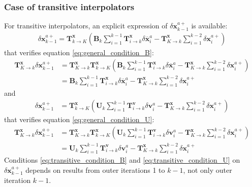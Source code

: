 \documentclass[12pt]{scrartcl}
\begin{document}
\subsubsection{Case of transitive interpolators}
For transitive interpolators, an explicit expression of $\delta \mathbf{x}^{a+}_{k-1}$ is available:
\begin{align}
\label{eq:transitive_condition_B}
\delta \mathbf{x}^{a+}_{k-1} = \mathbf{T}^\mathbf{x}_{k \rightarrow K} \left(\mathbf{B}_k \sum_{i=1}^{k-1} \mathbf{T}^\mathbf{x}_{i \rightarrow k} \delta \overline{\mathbf{x}}^a_i - \mathbf{T}^\mathbf{x}_{K \rightarrow k} \sum_{i=1}^{k-2} \delta \mathbf{x}^{a+}_i\right)
\end{align}
that verifies equation \eqref{eq:general_condition_B}:
\begin{align}
\mathbf{T}^\mathbf{x}_{K \rightarrow k} \delta \mathbf{x}^{a+}_{k-1} & = \mathbf{T}^\mathbf{x}_{K \rightarrow k} \mathbf{T}^\mathbf{x}_{k \rightarrow K} \left(\mathbf{B}_k \sum_{i=1}^{k-1} \mathbf{T}^\mathbf{x}_{i \rightarrow k} \delta \overline{\mathbf{x}}^a_i - \mathbf{T}^\mathbf{x}_{K \rightarrow k} \sum_{i=1}^{k-2} \delta \mathbf{x}^{a+}_i\right) \nonumber \\
& = \mathbf{B}_k \sum_{i=1}^{k-1} \mathbf{T}^\mathbf{x}_{i \rightarrow k} \delta \overline{\mathbf{x}}^a_i - \mathbf{T}^\mathbf{x}_{K \rightarrow k} \sum_{i=1}^{k-2} \delta \mathbf{x}^{a+}_i
\end{align}
and
\begin{align}
\label{eq:transitive_condition_U}
\delta \mathbf{x}^{a+}_{k-1} & = \mathbf{T}^\mathbf{x}_{k \rightarrow K} \left(\mathbf{U}_k \sum_{i=1}^{k-1} \mathbf{T}^\mathbf{v}_{i \rightarrow k} \delta \mathbf{v}^a_i - \mathbf{T}^\mathbf{x}_{K \rightarrow k} \sum_{i=1}^{k-2} \delta \mathbf{x}^{a+}_i\right)
\end{align}
that verifies equation \eqref{eq:general_condition_U}:
\begin{align}
\mathbf{T}^\mathbf{x}_{K \rightarrow k} \delta \mathbf{x}^{a+}_{k-1} & = \mathbf{T}^\mathbf{x}_{K \rightarrow k} \mathbf{T}^\mathbf{x}_{k \rightarrow K} \left(\mathbf{U}_k \sum_{i=1}^{k-1} \mathbf{T}^\mathbf{v}_{i \rightarrow k} \delta \mathbf{v}^a_i - \mathbf{T}^\mathbf{x}_{K \rightarrow k} \sum_{i=1}^{k-2} \delta \mathbf{x}^{a+}_i\right) \nonumber \\
& = \mathbf{U}_k \sum_{i=1}^{k-1} \mathbf{T}^\mathbf{v}_{i \rightarrow k} \delta \mathbf{v}^a_i - \mathbf{T}^\mathbf{x}_{K \rightarrow k} \sum_{i=1}^{k-2} \delta \mathbf{x}^{a+}_i
\end{align}
Conditions \eqref{eq:transitive_condition_B} and \eqref{eq:transitive_condition_U} on $\delta \mathbf{x}^{a+}_{k-1}$ depends on results from outer iterations 1 to $k-1$, not only outer iteration $k-1$.
\end{document}
